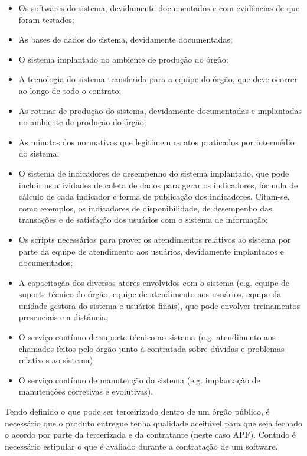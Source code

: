 \begin{itemize}
\item Os softwares do sistema, devidamente documentados e com evidências de que foram testados;
\item As bases de dados do sistema, devidamente documentadas;
\item O sistema implantado no ambiente de produção do órgão;
\item A tecnologia do sistema transferida para a equipe do órgão, que deve ocorrer ao longo de todo o contrato;
\item As rotinas de produção do sistema, devidamente documentadas e implantadas no ambiente de produção do órgão;
\item As minutas dos normativos que legitimem os atos praticados por intermédio do sistema;
\item O sistema de indicadores de desempenho do sistema implantado, que pode incluir as atividades de coleta de dados para gerar os indicadores, fórmula de cálculo de cada indicador e forma de publicação dos indicadores. Citam-se, como exemplos, os indicadores de disponibilidade, de desempenho das transações e de satisfação dos usuários com o sistema de informação;
\item Os scripts necessários para prover os atendimentos relativos ao sistema por parte da equipe de atendimento aos usuários, devidamente implantados e documentados;
\item A capacitação dos diversos atores envolvidos com o sistema (e.g. equipe de suporte técnico do órgão, equipe de atendimento aos usuários, equipe da unidade gestora do sistema e usuários finais), que pode envolver treinamentos presenciais e a distância;
\item O serviço contínuo de suporte técnico ao sistema (e.g. atendimento aos chamados feitos pelo órgão junto à contratada sobre dúvidas e problemas relativos ao sistema);
\item O serviço contínuo de manutenção do sistema (e.g. implantação de manutenções corretivas e evolutivas).
\end{itemize} 
Tendo definido o que pode ser terceirizado dentro de um órgão público, é necessário que o produto entregue tenha qualidade aceitável para que seja fechado o acordo por parte da tercerizada e da contratante (neste caso APF). Contudo é necessário estipular o que é avaliado durante a contratação de um software.

